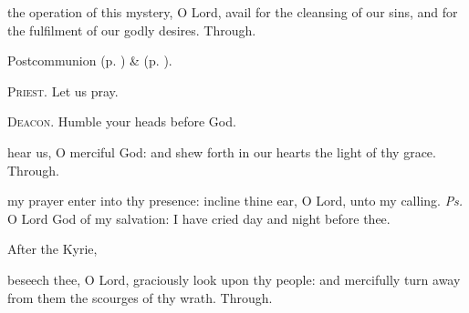 \postcommunion
{} the operation of this mystery, O Lord, avail for the cleansing of our sins, and for the fulfilment of our godly desires. Through.


\begin{rubric}
     Postcommunion  (p. \pageref{AshWednesdayMassPostcommunion}) \&   (p. \pageref{SPLivingDeparted}).
\end{rubric}

\textsc{Priest.} Let us pray.\par
\textsc{Deacon.} Humble your heads before God.\par
{} hear us, O merciful God: and shew forth in our hearts the light of thy grace. Through.


\clearpage
{}


\introit
{} my prayer enter into thy presence: incline thine ear, O Lord, unto my calling. \textit{Ps.} O Lord God of my salvation: I have cried day and night before thee.
\begin{rubric}
    After the Kyrie,
\end{rubric}

\collect
{} beseech thee, O Lord, graciously look upon thy people: and mercifully turn away from them the scourges of thy wrath. Through.


